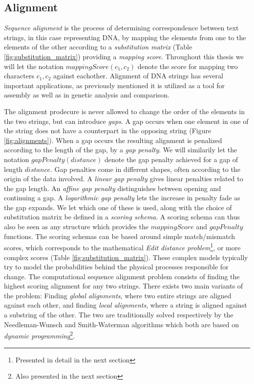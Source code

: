 \documentclass[thesis.tex]{subfiles}
\begin{document}
\subsection{Alignment}
\label{sec:alignment}
\textit{Sequence alignment} is the process of determining correspondence between text strings, in this case representing DNA, by mapping the elements from one to the elements of the other according to a \textit{substitution matrix} (Table \ref{fig:substitution_matrix}) providing a \textit{mapping score}. Throughout this thesis we will let the notation $mappingScore(c_1,c_2)$ denote the score for mapping two characters $c_1, c_2$ against eachother. Alignment of DNA strings has several important applications, as previously mentioned it is utilized as a tool for assembly as well as in genetic analysis and comparison.\\
\par\noindent
The alignment prodecure is never allowed to change the order of the elements in the two strings, but can introduce \textit{gaps}. A gap occurs when one element in one of the string does not have a counterpart in the opposing string (Figure \ref{fig:alignments}). When a gap occurs the resulting alignment is penalized according to the length of the gap, by a \textit{gap penalty}. We will similarily let the notation $gapPenalty(distance)$ denote the gap penalty achieved for a gap of length $distance$. Gap penalties come in different shapes, often according to the origin of the data involved. A \textit{linear gap penalty} gives linear penalties related to the gap length. An \textit{affine gap penalty} distinguishes between opening and continuing a gap. A \textit{logarithmic gap penalty} lets the increase in penalty fade as the gap expands. We let which one of these is used, along with the choice of substitution matrix be defined in a \textit{scoring schema}. A scoring schema can thus also be seen as any structure which provides the $mappingScore$ and $gapPenalty$ functions. The scoring schemas can be based around simple match/mismatch scores, which corresponds to the mathematical \textit{Edit distance problem}\footnote{Presented in detail in the next section}, or more complex scores (Table \ref{fig:substitution_matrix}). These complex models typically try to model the probabilities behind the physical processes responsible for change. The computational sequence alignment problem consists of finding the highest scoring alignment for any two strings. There exists two main variants of the problem: Finding \textit{global alignments}, where two entire strings are aligned against each other, and finding \textit{local alignments}, where a string is aligned against a substring of the other. The two are traditionally solved respectively by the Needleman-Wunsch and Smith-Waterman algorithms which both are based on \textit{dynamic programming}\footnote{Also presented in the next section}.\\
\end{document}
